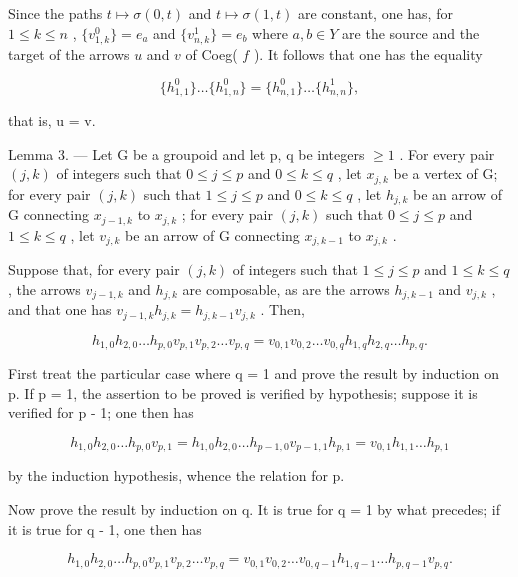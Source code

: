 Since the paths \(t \mapsto \sigma(0,t)\) and \(t \mapsto \sigma(1,t)\) are constant, one has, for \(1 \leqslant k \leqslant n\) , \(\{v_{1,k}^{0}\} = e_{a}\) and \(\{v_{n,k}^{1}\} = e_{b}\) where \(a,b \in Y\) are the source and the target of the arrows \(u\) and \(v\) of Coeg( \(f\) ). It follows that one has the equality

\[
\{h _ {1, 1} ^ {0} \} \dots \{h _ {1, n} ^ {0} \} = \{h _ {n, 1} ^ {0} \} \dots \{h _ {n, n} ^ {1} \},
\]

that is, u = v.

Lemma 3. --- Let G be a groupoid and let p, q be integers \(\geqslant 1\) . For every pair \((j, k)\) of integers such that \(0 \leqslant j \leqslant p\) and \(0 \leqslant k \leqslant q\) , let \(x_{j,k}\) be a vertex of G; for every pair \((j, k)\) such that \(1 \leqslant j \leqslant p\) and \(0 \leqslant k \leqslant q\) , let \(h_{j,k}\) be an arrow of G connecting \(x_{j-1,k}\) to \(x_{j,k}\) ; for every pair \((j, k)\) such that \(0 \leqslant j \leqslant p\) and \(1 \leqslant k \leqslant q\) , let \(v_{j,k}\) be an arrow of G connecting \(x_{j,k-1}\) to \(x_{j,k}\) .

Suppose that, for every pair \((j,k)\) of integers such that \(1 \leqslant j \leqslant p\) and \(1 \leqslant k \leqslant q\) , the arrows \(v_{j-1,k}\) and \(h_{j,k}\) are composable, as are the arrows \(h_{j,k-1}\) and \(v_{j,k}\) , and that one has \(v_{j-1,k}h_{j,k} = h_{j,k-1}v_{j,k}\) . Then,

\[
h _ {1, 0} h _ {2, 0} \dots h _ {p, 0} v _ {p, 1} v _ {p, 2} \dots v _ {p, q} = v _ {0, 1} v _ {0, 2} \dots v _ {0, q} h _ {1, q} h _ {2, q} \dots h _ {p, q}.
\]

First treat the particular case where q = 1 and prove the result by induction on p. If p = 1, the assertion to be proved is verified by hypothesis; suppose it is verified for p - 1; one then has

\[
h _ {1, 0} h _ {2, 0} \dots h _ {p, 0} v _ {p, 1} = h _ {1, 0} h _ {2, 0} \dots h _ {p - 1, 0} v _ {p - 1, 1} h _ {p, 1} = v _ {0, 1} h _ {1, 1} \dots h _ {p, 1}
\]

by the induction hypothesis, whence the relation for p.

Now prove the result by induction on q. It is true for q = 1 by what precedes; if it is true for q - 1, one then has

\[
h _ {1, 0} h _ {2, 0} \dots h _ {p, 0} v _ {p, 1} v _ {p, 2} \dots v _ {p, q} = v _ {0, 1} v _ {0, 2} \dots v _ {0, q - 1} h _ {1, q - 1} \dots h _ {p, q - 1} v _ {p, q}.
\]

